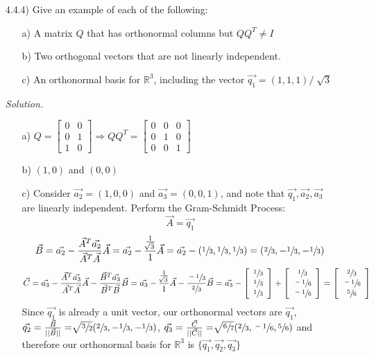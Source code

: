 \documentclass[12pt,pdftex]{article}
\begin{document}
\begin{itemize}
\item[4.4.4)] Give an example of each of the following:
\begin{itemize}
\item[a)] A matrix $Q$ that has orthonormal columns but $QQ^T\neq I$
\item[b)] Two orthogonal vectors that are not linearly independent.
\item[c)] An orthonormal basis for $\mathbb{R}^3$, including the vector $\vec{q_1}=(1,1,1)/\sqrt[]{3}$
\end{itemize}

\textit{Solution.}
\begin{itemize}
\item[a)] $Q=\left[\begin{array}{cc}
0 & 0\\ 
0 & 1\\ 
1 & 0 
\end{array}\right] \Rightarrow QQ^T=
\left[\begin{array}{ccc}
0 & 0 & 0\\ 
0 & 1 & 0\\ 
0 & 0 & 1
\end{array}\right]$
\item[b)] $(1,0)$ and $(0,0)$
\item[c)] Consider $\vec{a_2}=(1,0,0)$ and $\vec{a_3}=(0,0,1)$, and note that $\vec{q_1}, \vec{a_2}, \vec{a_3}$
 are linearly independent. Perform the Gram-Schmidt Process:
 \[\vec{A}=\vec{q_1}\]
 \[\vec{B}=\vec{a_2}-\frac{\vec{A}^T\vec{a_2}}{\vec{A}^T\vec{A}}\vec{A}=\vec{a_2}-\frac{\frac{1}{\sqrt[]{3}}}{1}\vec{A}
 =\vec{a_2}-(\sfrac{1}{3},\sfrac{1}{3},\sfrac{1}{3})=(\sfrac{2}{3},-\sfrac{1}{3},-\sfrac{1}{3})\]
 \[\vec{C}=\vec{a_3}-\frac{\vec{A}^T\vec{a_3}}{\vec{A}^T\vec{A}}\vec{A}-\frac{\vec{B}^T\vec{a_3}}{\vec{B}^T\vec{B}}\vec{B}=\vec{a_3}-\frac{\frac{1}{\sqrt[]{3}}}{1}\vec{A}-\frac{\sfrac{-1}{3}}{\sfrac{2}{3}}\vec{B}=\vec{a_3}- \left[\begin{array}{c}
\sfrac{1}{3}\\ 
\sfrac{1}{3}\\ 
\sfrac{1}{3}
\end{array}\right]+
 \left[\begin{array}{c}
\sfrac{1}{3}\\ 
\sfrac{-1}{6}\\ 
\sfrac{-1}{6}
\end{array}\right]=
 \left[\begin{array}{c}
\sfrac{2}{3}\\ 
\sfrac{-1}{6}\\ 
\sfrac{5}{6}
\end{array}\right]\]
Since $\vec{q_1}$ is already a unit vector, our orthonormal vectors are $\vec{q_1}$, $\vec{q_2}=\frac{\vec{B}}{||\vec{B}||}=\sqrt[]{\sfrac{3}{2}}(\sfrac{2}{3},-\sfrac{1}{3},-\sfrac{1}{3})$, $\vec{q_3}=\frac{\vec{C}}{||\vec{C}||}=\sqrt[]{\sfrac{6}{7}}(\sfrac{2}{3},\sfrac{-1}{6},\sfrac{5}{6})$ and therefore our orthonormal basis for $\mathbb{R}^3$ is $\{\vec{q_1},\vec{q_2},\vec{q_3}\}$
 \end{itemize}


\end{itemize}
\end{document}
